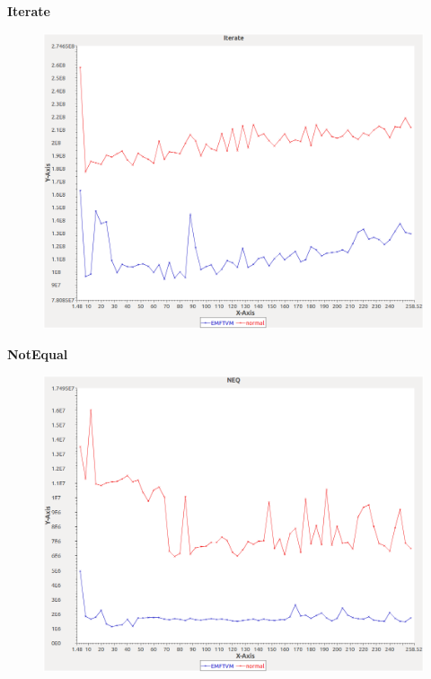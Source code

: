 \noindent\textbf{Iterate}

\begin{figure}[h]
\centering
\includegraphics[width=\textwidth]{graphs/bag/Iterate}
\end{figure}
\pagebreak

\noindent\textbf{NotEqual}

\begin{figure}[h]
\centering
\includegraphics[width=\textwidth]{graphs/bag/NEQ}
\end{figure}
\pagebreak


